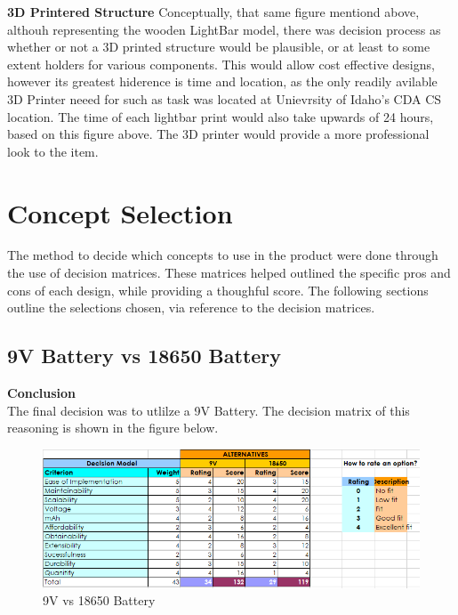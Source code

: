\documentclass[12pt]{article}
\begin{document}
{{{				%
			
			\noindent \textbf{3D Printered Structure}
			Conceptually, that same figure mentiond above, althouh representing the wooden LightBar model, there was decision process as whether or not a 3D printed structure would be plausible, or at least to some extent holders for various components. This would allow cost effective designs, however its greatest hiderence is time and location, as the only readily avilable 3D Printer neeed for such as task was located at Unievrsity of Idaho's CDA CS location. The time of each lightbar print would also take upwards of 24 hours, based on this figure above. The 3D printer would provide a more professional look to the item.
			
			\newpage
	
	\section{Concept Selection}
	The method to decide which concepts to use in the product were done through the use of decision matrices. These matrices helped outlined the specific pros and cons of each design, while providing a thoughful score. The following sections outline the selections chosen, via reference to the decision matrices.
	
		\subsection{9V Battery vs 18650 Battery}
			
			\noindent\textbf{Conclusion}\\
				The final decision was to utlilze a 9V Battery. The decision matrix of this reasoning is shown in the figure below.
				
				\begin{figure}[ht!]
					\centering
					\includegraphics[width=120mm]{assets/9V_vs_18650.png}
					\caption{9V vs 18650 Battery \label{overflow}}
				\end{figure}
		
}}}
\end{document}
